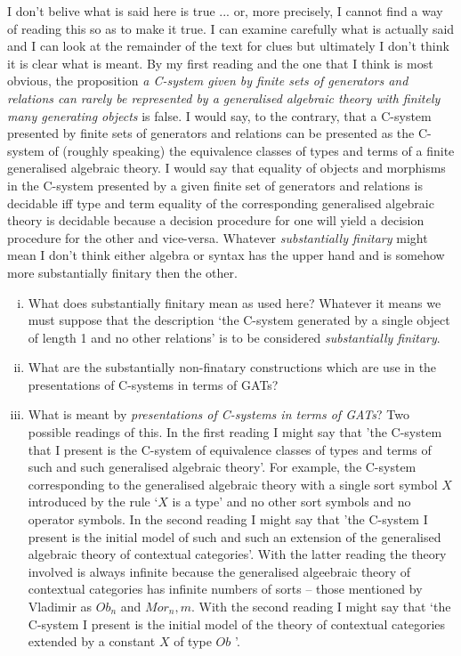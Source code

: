 \documentclass[14pt,a4paper]{scrartcl}
\begin{document}
\begin{enumerate}
I don't belive what is said here is true ... or, more precisely,  I cannot find a way of reading this so as to make it true. I can examine carefully what is actually said and I can look at the remainder of the text for clues but ultimately I don't think it is clear what is meant. By my first reading and the one that I think is most obvious, 
the proposition \textit{a C-system given by finite sets of generators and relations can rarely be represented by a generalised algebraic theory with finitely many generating objects} is false. I would say, to the contrary, that a C-system presented by finite sets of generators and relations can be presented as the 
C-system of (roughly speaking) the equivalence classes of types and terms of a finite generalised algebraic theory. I would say that equality of objects and morphisms in the C-system presented by a given finite set of generators and relations is decidable iff type and term equality of the corresponding generalised algebraic theory is decidable because a decision procedure for one will yield a decision procedure for the other and vice-versa. Whatever \textit{substantially finitary} might mean I don't think either algebra or syntax has the upper hand and is somehow more substantially finitary then the other. 

\begin{enumerate}[(i)] 
\item What does substantially finitary mean as used here? Whatever it means we must suppose that the description `the C-system generated by a single object of length 1 and no other relations' is to be considered \textit{substantially finitary}. 
\item What are the substantially non-finatary constructions which are use in the presentations of C-systems in terms of GATs? 
\item What is meant by \textit{presentations of C-systems in terms of GATs}? Two possible readings of this. In the first reading
I might say that 'the C-system that I present is the C-system of equivalence classes of types and terms of such and such generalised algebraic theory'.
For example, the C-system corresponding to the generalised algebraic theory with a single sort symbol $X$ introduced by the rule `$X$ is a type' and no other sort symbols and no operator symbols. In the second reading I might say that 'the C-system I present is the initial model of such and such an extension of the generalised algebraic theory of contextual categories'. With the latter reading the theory involved is always infinite because the generalised algeebraic theory
of contextual categories has infinite numbers of sorts -- those mentioned by Vladimir as $Ob_n$ and $Mor_n,m$. With the second reading I might say that
`the C-system I present is the initial model of the theory of contextual categories extended by a constant $X$ of type $Ob$ '.
\end{enumerate}
\end{enumerate}


\end{document}

